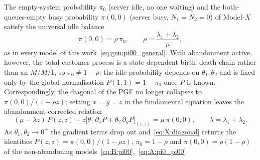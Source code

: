 \begin{corollary}\label{cor:X:pi00}
    The empty-system probability $\pi_0$ (server idle, no one waiting) and the
    both-queues-empty busy probability $\pi(0,0)$ (server busy, $N_1=N_2=0$) of
    Model-$X$ satisfy the universal idle balance
    \begin{equation}
        \pi(0,0) = \rho\,\pi_0,
        \qquad \rho=\frac{\lambda_1+\lambda_2}{\mu},
        \label{eq:X:pi00}
    \end{equation}
    as in every model of this work~\eqref{eq:gen:pi00_general}. With abandonment
    active, however, the total-customer process is a state-dependent
    birth--death chain rather than an $M/M/1$, so $\pi_0\neq 1-\rho$: the idle
    probability depends on $\theta_1,\theta_2$ and is fixed only by the global
    normalisation $P(1,1)=1-\pi_0$ once $P$ is known. Correspondingly, the diagonal of
    the PGF no longer collapses to $\pi(0,0)/(1-\rho z)$; setting $x=y=z$ in the
    fundamental equation leaves the abandonment-corrected relation
    \begin{equation}
        (\mu-\lambda z)\,P(z,z)
        + z\bigl[\theta_1\,\partial_x P + \theta_2\,\partial_y P\bigr]_{(z,z)}
        = \mu\,\pi(0,0),
        \qquad \lambda=\lambda_1+\lambda_2.
        \label{eq:X:diagonal}
    \end{equation}
    As $\theta_1,\theta_2\to 0^+$ the gradient terms drop out and~\eqref{eq:X:diagonal}
    returns the identities $P(z,z)=\pi(0,0)/(1-\rho z)$, $\pi_0=1-\rho$ and
    $\pi(0,0)=\rho(1-\rho)$ of the non-abandoning
    models~\eqref{eq:B:pi00},~\eqref{eq:A:pi0_pi00}.
\end{corollary}

